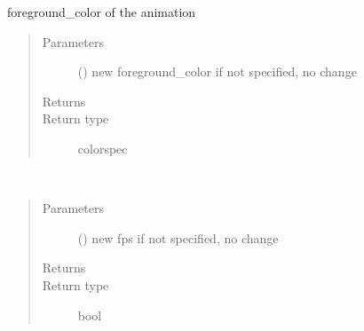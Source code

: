\documentclass[letterpaper,10pt,english]{sphinxmanual}
\begin{document}
\begin{fulllineitems}
\begin{fulllineitems}
\end{fulllineitems}


\begin{fulllineitems}
\label{\detokenize{Reference:salabim.Environment.foreground_color}}
foreground\_color of the animation
\begin{quote}\begin{description}
\item[{Parameters}] \leavevmode
{} () \textendash{} new foreground\_color 
if not specified, no change

\item[{Returns}] \leavevmode
{}

\item[{Return type}] \leavevmode
colorspec

\end{description}\end{quote}

\end{fulllineitems}


\begin{fulllineitems}
\label{\detokenize{Reference:salabim.Environment.fps}}~\begin{quote}\begin{description}
\item[{Parameters}] \leavevmode
{} () \textendash{} new fps 
if not specified, no change

\item[{Returns}] \leavevmode
{}

\item[{Return type}] \leavevmode
bool

\end{description}\end{quote}

\end{fulllineitems}



\end{fulllineitems}
\end{document}
